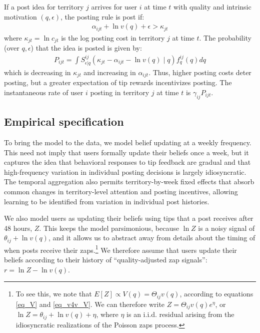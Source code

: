 If a post idea for territory $j$ arrives for user $i$ at time $t$ with quality and intrinsic motivation $(q,\epsilon)$, the posting rule is post if:
\begin{align}
\alpha_{ijt} + \ln v(q) + \epsilon > \kappa_{jt}
\end{align}
where $\kappa_{jt} = \ln c_{jt}$ is the log posting cost in territory $j$ at time $t$.  The probability (over $q, \epsilon$) that the idea is posted is given by:
\begin{align}
P_{ijt} = \int S^{ij}_{\epsilon|q} \left( \kappa_{jt} - \alpha_{ijt} - \ln v(q) \mid q \right) f^{ij}_q(q) dq
\end{align}
which is decreasing in $\kappa_{jt}$ and increasing in $\alpha_{ijt}$. Thus, higher posting costs deter posting, but a greater expectation of tip rewards incentivizes posting. The instantaneous rate of user $i$ posting in territory $j$ at time $t$ is $\gamma_{ij} P_{ijt}$.

\subsection{Empirical specification}

To bring the model to the data, we model belief updating at a weekly frequency. This need not imply that users formally update their beliefs once a week, but it captures the idea that behavioral responses to tip feedback are gradual and that high-frequency variation in individual posting decisions is largely idiosyncratic. The temporal aggregation also permits territory-by-week fixed effects that absorb common changes in territory-level attention and posting incentives, allowing learning to be identified from variation in individual post histories. 

We also model users as updating their beliefs using tips that a post receives after 48 hours, $Z$. This keeps the model parsimonious, because $\ln Z$ is a noisy signal of $\theta_{ij} + \ln v(q)$, and it allows us to abstract away from details about the timing of when posts receive their zaps.\footnote{To see this, we note that $E[Z] \propto V(q) = \Theta_{ij}v(q)$, according to equations \eqref{eq_V} and \eqref{eq_v4v_V}. We can therefore write $Z = \Theta_{ij} v(q) e^{\eta}$, or $\ln Z = \theta_{ij} + \ln v(q) + \eta$, where $\eta$ is an i.i.d. residual arising from the idiosyncratic realizations of the Poisson zaps process.} We therefore assume that users update their beliefs according to their history of ``quality-adjusted zap signals'': $r = \ln Z - \ln v(q)$.

